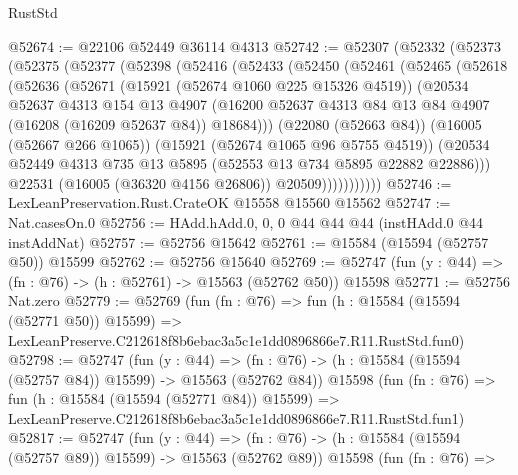 \begin{lexlean}{RustStd}
\begin{coremodule}
@52674 := @22106 @52449 @36114 @4313
@52742 := @52307
    (@52332
      (@52373
        (@52375
          (@52377
            (@52398
              (@52416
                (@52433
                  (@52450
                    (@52461
                      (@52465
                        (@52618
                          (@52636
                            (@52671
                              (@15921 (@52674 @1060 @225 @15326 @4519))
                              (@20534
                                @52637
                                @4313
                                @154
                                @13
                                @4907
                                (@16200
                                  @52637
                                  @4313
                                  @84
                                  @13
                                  @84
                                  @4907
                                  (@16208 (@16209 @52637 @84))
                                  @18684)))
                            (@22080 (@52663 @84))
                            (@16005 (@52667 @266 @1065))
                            (@15921 (@52674 @1065 @96 @5755 @4519))
                            (@20534
                              @52449
                              @4313
                              @735
                              @13
                              @5895
                              (@52553 @13 @734 @5895 @22882 @22886)))
                          @22531
                          (@16005 (@36320 @4156 @26806))
                          @20509)))))))))))
@52746 := LexLeanPreservation.Rust.CrateOK @15558 @15560 @15562
@52747 := Nat.casesOn.{0}
@52756 := HAdd.hAdd.{0, 0, 0} @44 @44 @44 (instHAdd.{0} @44 instAddNat)
@52757 := @52756 @15642
@52761 := @15584 (@15594 (@52757 @50)) @15599
@52762 := @52756 @15640
@52769 := @52747 (fun (y : @44) => (fn : @76) -> (h : @52761) -> @15563 (@52762 @50)) @15598
@52771 := @52756 Nat.zero
@52779 := @52769
    (fun (fn : @76) =>
    fun (h : @15584 (@15594 (@52771 @50)) @15599) =>
    LexLeanPreserve.C212618f8b6ebac3a5c1e1dd0896866e7.R11.RustStd.fun0)
@52798 := @52747
    (fun (y : @44) =>
    (fn : @76) -> (h : @15584 (@15594 (@52757 @84)) @15599) -> @15563 (@52762 @84))
    @15598
    (fun (fn : @76) =>
    fun (h : @15584 (@15594 (@52771 @84)) @15599) =>
    LexLeanPreserve.C212618f8b6ebac3a5c1e1dd0896866e7.R11.RustStd.fun1)
@52817 := @52747
    (fun (y : @44) =>
    (fn : @76) -> (h : @15584 (@15594 (@52757 @89)) @15599) -> @15563 (@52762 @89))
    @15598
    (fun (fn : @76) =>

\end{coremodule}
\end{lexlean}
